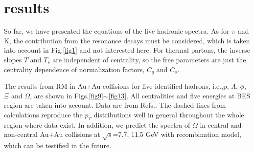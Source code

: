 \documentclass[twocolumn,aps,superscriptaddress,showpacs,nofootinbib,floatfix]{revtex4}
\begin{document}
\section{results}\label{results5}
So far, we have presented the equations of the five hadronic spectra. As for $\pi$ and K, the contribution from the resonance decays must be considered, which is taken into account in Fig.\ref{fig1} and not interested here. For thermal partons, the inverse slopes $T$ and $T_s$ are independent of centrality, so the free parameters are just the centrality dependence of normalization factors, $C_q$ and $C_s$\cite{3c}.

The results from RM in Au+Au collisions for five identified hadrons, i.e.,p, $\Lambda$, $\phi$, $\Xi$ and $\Omega$, are shown in Figs.\ref{fig9}$\sim$\ref{fig13}. All centralities and five energies at BES region are taken into account. Data are from Refs.\cite{STAR:2019bjj,STAR:2017sal,STAR:2015vvs}. The dashed lines from calculations reproduce the $p_T$ distributions well in general throughout the whole region where data exist. In addition, we predict the spectra of $\Omega$ in central and non-central Au+Au collisions at $\sqrt{s}$=7.7, 11.5 GeV with recombination model, which can be testified in the future.
\end{document}
